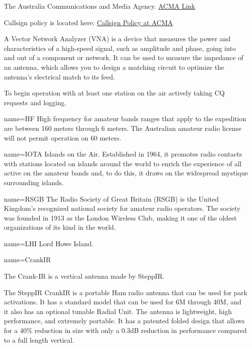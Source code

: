 {
The Australia Communications and Media Agency. 
\href{https://www.acma.gov.au/amateur-radio}{ACMA Link}
\par
Callsign policy is located here: \href{https://www.acma.gov.au/sites/default/files/2024-05/Amateur\%20radio\%20call\%20sign\%20policy\_April\%202024.pdf}{Callsign Policy at ACMA}
}

{
A Vector Network Analyzer (VNA) is a device that measures the power and characteristics of a high-speed signal, such as amplitude and phase, going into and out of a component or network. It can be used to measure the impedance of an antenna, which allows you to design a matching circuit to optimize the antenna's electrical match to its feed. 
}

{
To begin operation with at least one station on the air
actively taking CQ requests and logging.
}


 { name={{HF}} }
{
High frequency for amateur bands ranges that apply to the expedition
are between 160 meters through 6 meters.  The Australian amateur
radio license will not permit operation on 60 meters.}

 { name={{IOTA}} }
{Islands on the Air. 
Established in 1964, it promotes radio contacts with stations located on islands around the world to enrich the experience of all active on the amateur bands and, to do this, it draws on the widespread mystique surrounding islands.}


 { name={{RSGB}} }
{
The Radio Society of Great Britain (RSGB) is the United Kingdom's recognized national society for amateur radio operators. The society was founded in 1913 as the London Wireless Club, making it one of the oldest organizations of its kind in the world.
}


 { name={{LHI}} }
{
Lord Howe Island.
}


 { name={{CrankIR}} }
{
The Crank-IR is a vertical antenna made by SteppIR.
\par
The SteppIR CrankIR is a portable Ham radio antenna that can be used for park activations. It has a standard model that can be used for 6M through 40M, and it also has an optional tunable Radial Unit. The antenna is lightweight, high performance, and extremely portable. It has a patented folded design that allows for a 40\% reduction in size with only a 0.3dB reduction in performance compared to a full length vertical.
}

